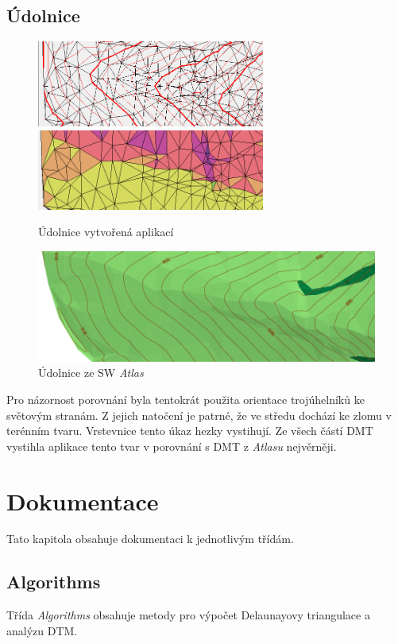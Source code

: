 \documentclass[a4paper, 12pt]{article}
\begin{document}
\subsection{Údolnice}
\begin{figure}[h!]
	\centering
	\includegraphics[width=7.5cm]{./pictures/kupec_thalweg_contours.png}
	\includegraphics[width=7.5cm]{./pictures/kupec_thalweg_aspect.png}
	\caption{Údolnice vytvořená aplikací}
\end{figure}

\begin{figure}[h!]
	\centering
	\includegraphics[width=15cm]{./pictures/atlas_thalweg.png}
	\caption{Údolnice ze SW \textit{Atlas}}
\end{figure}

Pro názornost porovnání byla tentokrát použita orientace trojúhelníků ke světovým stranám. Z jejich natočení je patrné, že ve středu dochází ke zlomu v terénním tvaru. Vrstevnice tento úkaz hezky vystihují. Ze všech částí DMT vystihla aplikace tento tvar v porovnání s DMT z \textit{Atlasu} nejvěrněji.
\clearpage
 
\section{Dokumentace}
Tato kapitola obsahuje dokumentaci k jednotlivým třídám.

\subsection{Algorithms}
Třída \textit{Algorithms} obsahuje metody pro výpočet Delaunayovy triangulace a analýzu DTM.
\end{document}
